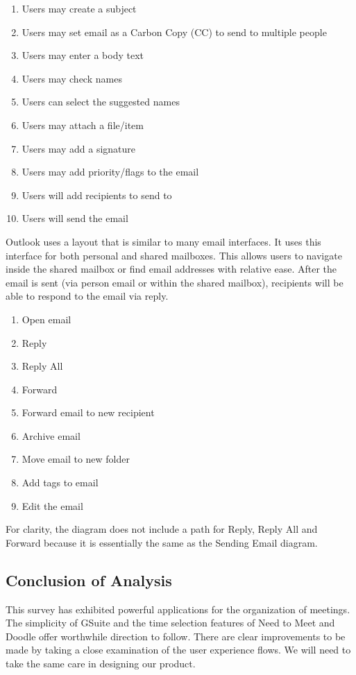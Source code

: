 \documentclass{sigchi}
\begin{document}
\begin{enumerate}
\item Users may create a subject
\item Users may set email as a Carbon Copy (CC) to send to multiple people
\item Users may enter a body text
\item Users may check names
\item Users can select the suggested names
\item Users may attach a file/item
\item Users may add a signature
\item Users may add priority/flags to the email
\item Users will add recipients to send to
\item Users will send the email
\end{enumerate}

Outlook uses a layout that is similar to many email interfaces. It uses this interface for both personal and shared mailboxes. This allows users to navigate inside the shared mailbox or find email addresses with relative ease.
After the email is sent (via person email or within the shared mailbox), recipients will be able to respond to the email via reply.

\begin{enumerate}
\item Open email
\item Reply
\item Reply All
\item Forward
\item Forward email to new recipient
\item Archive email
\item Move email to new folder
\item Add tags to email
\item Edit the email
\end{enumerate}

For clarity, the diagram does not include a path for Reply, Reply All and Forward because it is essentially the same as the Sending Email diagram.
\FloatBarrier
\subsection{Conclusion of Analysis}

This survey has exhibited powerful applications for the organization of meetings.
The simplicity of GSuite and the time selection features of Need to Meet and Doodle offer worthwhile direction to follow.
There are clear improvements to be made by taking a close examination of the user experience flows.
We will need to take the same care in designing our product.
\end{document}
